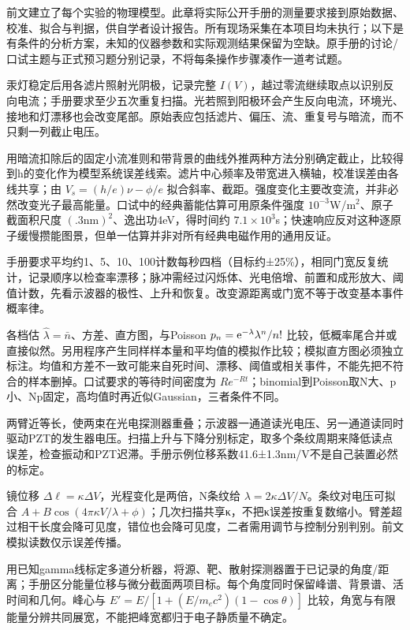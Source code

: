 前文建立了每个实验的物理模型。此章将实际公开手册的测量要求接到原始数据、校准、拟合与判据，供自学者设计报告。所有现场采集在本项目均未执行；以下是有条件的分析方案，未知的仪器参数和实际观测结果保留为空缺。原手册的讨论/口试主题与正式预习题分别记录，不将每条操作步骤凑作一道考试题。

汞灯稳定后用各滤片照射光阴极，记录完整 $I(V)$，越过零流继续取点以识别反向电流；手册要求至少五次重复扫描。光若照到阳极环会产生反向电流，环境光、接地和灯漂移也会改变尾部。原始表应包括滤片、偏压、流、重复号与暗流，而不只剩一列截止电压。

用暗流扣除后的固定小流准则和带背景的曲线外推两种方法分别确定截止，比较得到h的变化作为模型系统误差线索。滤片中心频率及带宽进入横轴，校准误差由各线共享；由 $V_s=(h/e)\nu-\phi/e$ 拟合斜率、截距。强度变化主要改变流，并非必然改变光子最高能量。口试中的经典蓄能估算可用原条件强度 $10^{-3}$W/m$^2$、原子截面积尺度 $(.3\mathrm{nm})^2$、逸出功4eV，得时间约 $7.1\times10^3$s；快速响应反对这种逐原子缓慢攒能图景，但单一估算并非对所有经典电磁作用的通用反证。

手册要求平均约1、5、10、100计数每秒四档（目标约±25\%），相同门宽反复统计，记录顺序以检查率漂移；脉冲需经过闪烁体、光电倍增、前置和成形放大、阈值计数，先看示波器的极性、上升和恢复。改变源距离或门宽不等于改变基本事件概率律。

各档估 $\hat\lambda=\bar n$、方差、直方图，与Poisson $p_n=\mathrm e^{-\lambda}\lambda^n/n!$ 比较，低概率尾合并或直接似然。另用程序产生同样样本量和平均值的模拟作比较；模拟直方图必须独立标注。均值和方差不一致可能来自死时间、漂移、阈值或相关事件，不能先把不符合的样本删掉。口试要求的等待时间密度为 $Re^{-Rt}$；binomial到Poisson取N大、p小、Np固定，高均值时再近似Gaussian，三者条件不同。

两臂近等长，使两束在光电探测器重叠；示波器一通道读光电压、另一通道读同时驱动PZT的发生器电压。扫描上升与下降分别标定，取多个条纹周期来降低读点误差，检查振动和PZT迟滞。手册示例位移系数41.6±1.3nm/V不是自己装置必然的标定。

镜位移 $\Delta\ell=\kappa\Delta V$，光程变化是两倍，N条纹给 $\lambda=2\kappa\Delta V/N$。条纹对电压可拟合 $A+B\cos(4\pi\kappa V/\lambda+\phi)$；几次扫描共享κ，不把κ误差按重复数缩小。臂差超过相干长度会降可见度，错位也会降可见度，二者需用调节与控制分别判别。前文模拟读数仅示误差传播。

用已知gamma线标定多道分析器，将源、靶、散射探测器置于已记录的角度/距离；手册区分能量位移与微分截面两项目标。每个角度同时保留峰谱、背景谱、活时间和几何。峰心与 $E'=E/[1+(E/m_ec^2)(1-\cos\theta)]$ 比较，角宽与有限能量分辨共同展宽，不能把峰宽都归于电子静质量不确定。

